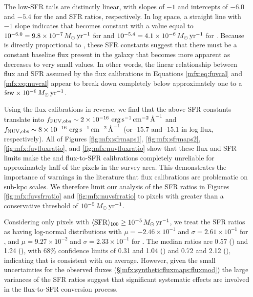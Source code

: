 \documentclass[iop, tighten]{emulateapj}
\begin{document}
The low-SFR tails are distinctly linear, with slopes of $-1$ and intercepts of
$-6.0$ and $-5.4$ for the \fuv{} and \nuv{} SFR ratios, respectively. In log
space, a straight line with $-1$ slope indicates that \sfrx{} becomes constant
with a value equal to $10^{-6.0} = 9.8\times 10^{-7}\,M_\odot\,\mathrm{yr}^{-1}$ for \fuv{}
and $10^{-5.4} = 4.1\times 10^{-6}\,M_\odot\,\mathrm{yr}^{-1}$ for \nuv{}. Because \sfrx{} is
directly proportional to \fxobs{}, these SFR constants suggest that there must
be a constant baseline flux present in the galaxy that becomes more apparent as
\sfroneh{} decreases to very small values. In other words, the linear
relationship between flux and SFR assumed by the flux calibrations in Equations
\ref{mfx:eq:fuvcal} and \ref{mfx:eq:nuvcal} appear to break down completely
below \sfroneh{} approximately one to a $\mathrm{few} \times
10^{-6}\,M_\odot\,\mathrm{yr}^{-1}$.

Using the flux calibrations in reverse, we find that the above SFR constants
translate into $f_{\mathrm{FUV},\mathrm{obs}} \sim 2\times 10^{-16}\, \,\mathrm{erg}\,\mathrm{s}^{-1}\,\mathrm{cm}^{-2}\,\textrm{\AA}^{-1}$ and $f_{\mathrm{NUV},\mathrm{obs}} \sim
8\times 10^{-16}\, \,\mathrm{erg}\,\mathrm{s}^{-1}\,\mathrm{cm}^{-2}\,\textrm{\AA}^{-1}$ (or -15.7 and -15.1 in log flux, respectively). All
of Figures  \ref{fig:mfx:sfrmaps1}, \ref{fig:mfx:sfrmaps2},
\ref{fig:mfx:fuvfluxratio}, and \ref{fig:mfx:nuvfluxratio} show that these flux
and SFR limits make the \fuv{} and \nuv{} flux-to-SFR calibrations completely
unreliable for approximately half of the pixels in the survey area. This
demonstrates the importance of warnings in the literature
\citep[e.g.,][]{Murphy:2011,Kennicutt:2012,Leroy:2012} that flux calibrations
are problematic on sub-kpc scales. We therefore limit our analysis of the SFR
ratios in Figures \ref{fig:mfx:fuvsfrratio} and \ref{fig:mfx:nuvsfrratio} to
pixels with \sfroneh{} greater than a conservative threshold of
$10^{-5}\,M_\odot\,\mathrm{yr}^{-1}$.

Considering only pixels with $\langle\mathrm{SFR}\rangle_{100} \ge 10^{-5}\,M_\odot\,\mathrm{yr}^{-1}$, we treat the
SFR ratios as having log-normal distributions with $\mu = -2.46\times 10^{-1}$
and $\sigma = 2.61\times 10^{-1}$ for \fuv{}, and $\mu = 9.27\times 10^{-2}$
and $\sigma = 2.33\times 10^{-1}$ for \nuv{}. The median ratios are 0.57
(\fuv{}) and 1.24 (\nuv{}), with 68\% confidence limits of 0.31 and 1.04
(\fuv{}) and 0.72 and 2.12 (\nuv{}), indicating that \sfrx{} is consistent with
\sfroneh{} on average. However, given the small uncertainties for the observed
fluxes (\S \ref{mfx:syntheticfluxmaps:fluxmod}) the large variances of the SFR
ratios suggest that significant systematic effects are involved in the
flux-to-SFR conversion process.
\end{document}
